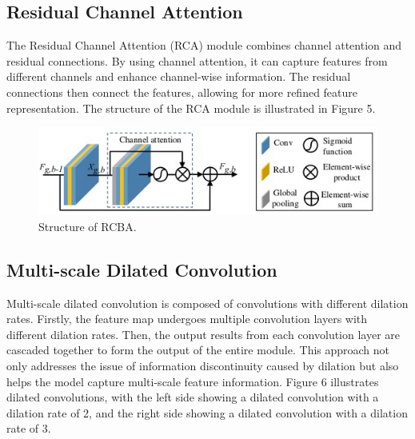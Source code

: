 \documentclass[10pt,twocolumn,letterpaper]{article}
\begin{document}

\subsection{Residual Channel Attention}

The Residual Channel Attention (RCA)\cite{RCAB} module combines channel attention and residual connections. By using channel attention, it can capture features from different channels and enhance channel-wise information. The residual connections then connect the features, allowing for more refined feature representation. The structure of the RCA module is illustrated in Figure 5.

\begin{figure}[htbp]   %
	\centering
	\includegraphics[width=\linewidth,scale=1.00]{Images/RCBA.png}
	\caption{Structure of RCBA.}
	\label{fig:rcba}
\end{figure}


\subsection{Multi-scale Dilated Convolution}

Multi-scale dilated convolution\cite{MSD} is composed of convolutions with different dilation rates. Firstly, the feature map undergoes multiple convolution layers with different dilation rates. Then, the output results from each convolution layer are cascaded together to form the output of the entire module. This approach not only addresses the issue of information discontinuity caused by dilation but also helps the model capture multi-scale feature information. Figure 6 illustrates dilated convolutions, with the left side showing a dilated convolution with a dilation rate of 2, and the right side showing a dilated convolution with a dilation rate of 3.
\end{document}
